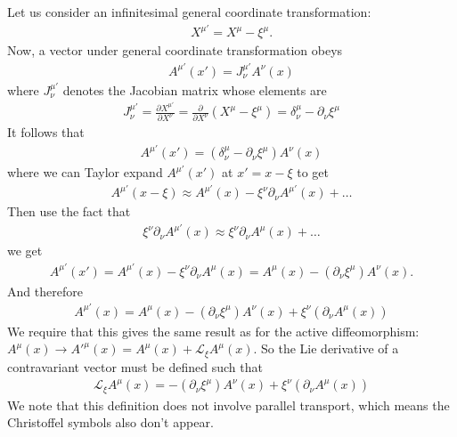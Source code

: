 \documentclass{book}
\numberwithin{equation}{section}
\theoremstyle{definition}
\newcommand{\p}{\partial}
\newcommand{\lag}{\mathcal{L}}
\newcommand{\f}[2]{\frac{#1}{#2}}
\newcommand{\lp}{\left(}
\newcommand{\rp}{\right)}
\begin{document}
Let us consider an infinitesimal general coordinate transformation:
\begin{align}
X^{\mu'} = X^\mu - \xi^\mu.
\end{align}
Now, a vector under general coordinate transformation obeys 
\begin{align*}
A^{\mu'}(x') = J^{\mu'}_{\nu}A^\nu(x)
\end{align*}
where $J^{\mu'}_\nu$ denotes the Jacobian matrix whose elements are
\begin{align}
\boxed{J^{\mu'}_\nu = \f{\p X^{\mu'}}{\p X^\nu} = \f{\p}{\p X^\nu}\lp X^\mu - \xi^\mu \rp = \delta^{\mu}_\nu - \p_\nu \xi^\mu}
\end{align}
It follows that
\begin{align}
A^{\mu'}(x') = \lp \delta^\mu_\nu - \p_\nu \xi^\mu \rp A^\nu (x)
\end{align}
where we can Taylor expand $A^{\mu'}(x')$ at $x' = x-\xi$ to get
\begin{align}
A^{\mu'}(x-\xi) \approx A^{\mu'}(x) - \xi^\nu \p_\nu A^{\mu'}(x) + \dots
\end{align}
Then use the fact that 
\begin{align}
\xi^\nu \p_\nu A^{\mu'}(x) \approx \xi^\nu \p_\nu A^{\mu}(x) + \dots
\end{align}
we get
\begin{align}
A^{\mu'}(x') = A^{\mu'}(x) - \xi^\nu\p_\nu A^\mu(x) = A^\mu(x) - (\p_\nu\xi^\mu)A^\nu(x).
\end{align}
And therefore
\begin{align}
\boxed{A^{\mu'}(x) = A^{\mu}(x) - (\p_\nu\xi^\mu)A^\nu(x) + \xi^\nu (\p_\nu A^\mu(x))}
\end{align}
We require that this gives the same result as for the active diffeomorphism: $A^\mu(x) \to A'^{\mu}(x) = A^\mu(x) + \lag_\xi A^\mu(x)$. So the Lie derivative of a contravariant vector must be defined such that
\begin{align}
\boxed{ 
\lag_\xi A^\mu(x) = -(\p_\nu\xi^\mu)A^\nu(x)+ \xi^\nu (\p_\nu A^\mu(x))
}
\end{align}
We note that this definition does not involve parallel transport, which means the Christoffel symbols also don't appear. \\
\end{document}
